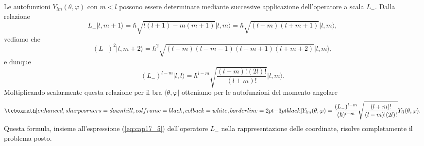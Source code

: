 \documentclass[a4paper,12pt,oneside]{book}
\begin{document}
Le autofunzioni $Y_{lm}(\theta , \varphi)$ con $m<l$ possono essere determinate mediante successive applicazione dell'operatore a scala $L_-$. Dalla relazione
	\begin{equation}
		L_-\vert l, m+1 \rangle = \hbar \sqrt{l(l+1) - m(m+1)} \vert l,m \rangle = \hbar \sqrt{(l-m)(l+m+1)} \vert l,m \rangle ,
	\end{equation}
vediamo che 
	\begin{equation}
	(L_-)^2 \vert l, m+2 \rangle = \hbar ^2 \sqrt{(l-m)(l-m-1)(l+m+1)(l+m+2)}\vert l,m \rangle ,
	\end{equation}
e dunque
	\begin{equation}
	(L_-)^{l-m} \vert l, l \rangle = \hbar ^{l-m} \sqrt{\frac{(l-m)!(2l)!}{(l+m)!}}\vert l,m \rangle .
	\end{equation}
Moltiplicando scalarmente questa relazione per il bra $\langle \theta , \varphi \vert $ otteniamo per le autofunzioni del momento angolare
	\begin{equation}
		\tcboxmath[enhanced, sharp corners=downhill, colframe=black, colback=white, borderline={2pt}{-3pt}{black}]{
			Y_{lm} (\theta ,  \varphi ) = \frac{(L_-)^{l-m}}{(\hbar )^{l-m}}\sqrt{\frac{(l+m)!}{(l-m)!(2l)!}} Y_{ll} (\theta , \varphi) . 
		}
	\end{equation}
Questa formula, insieme all'espressione (\ref{eq:cap17_5}) dell'operatore $L_-$ nella rappresentazione delle coordinate, risolve completamente il problema posto.\\
\end{document}
